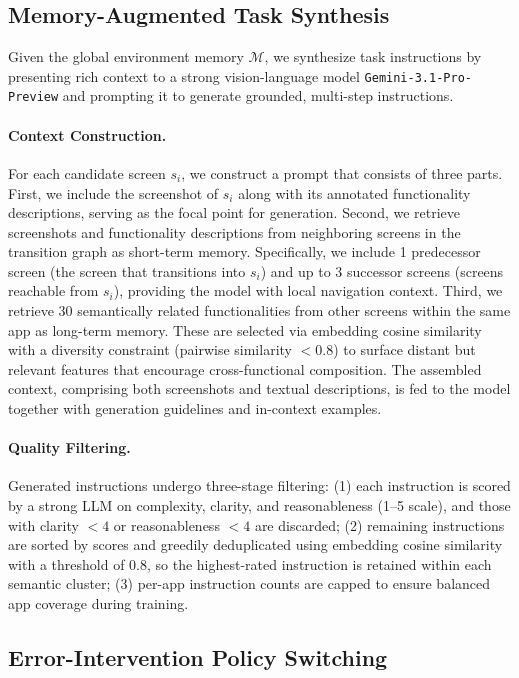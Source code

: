 \documentclass{article} %
\begin{document}
\subsection{Memory-Augmented Task Synthesis}
\label{app:task_synthesis}

Given the global environment memory $\mathcal{M}$, we synthesize task instructions by presenting rich context to a strong vision-language model \texttt{Gemini-3.1-Pro-Preview} and prompting it to generate grounded, multi-step instructions.

\paragraph{Context Construction.}
For each candidate screen $s_i$, we construct a prompt that consists of three parts.
First, we include the screenshot of $s_i$ along with its annotated functionality descriptions, serving as the focal point for generation.
Second, we retrieve screenshots and functionality descriptions from neighboring screens in the transition graph as short-term memory. Specifically, we include 1 predecessor screen (the screen that transitions into $s_i$) and up to 3 successor screens (screens reachable from $s_i$), providing the model with local navigation context.
Third, we retrieve 30 semantically related functionalities from other screens within the same app as long-term memory. These are selected via embedding cosine similarity with a diversity constraint (pairwise similarity $< 0.8$) to surface distant but relevant features that encourage cross-functional composition.
The assembled context, comprising both screenshots and textual descriptions, is fed to the model together with generation guidelines and in-context examples.


\paragraph{Quality Filtering.}
Generated instructions undergo three-stage filtering:
(1) each instruction is scored by a strong LLM on complexity, clarity, and reasonableness (1--5 scale), and those with clarity $< 4$ or reasonableness $< 4$ are discarded;
(2) remaining instructions are sorted by scores and greedily deduplicated using embedding cosine similarity with a threshold of 0.8, so the highest-rated instruction is retained within each semantic cluster;
(3) per-app instruction counts are capped to ensure balanced app coverage during training.

\subsection{Error-Intervention Policy Switching}
\label{app:policy_switching_detail}
\end{document}
